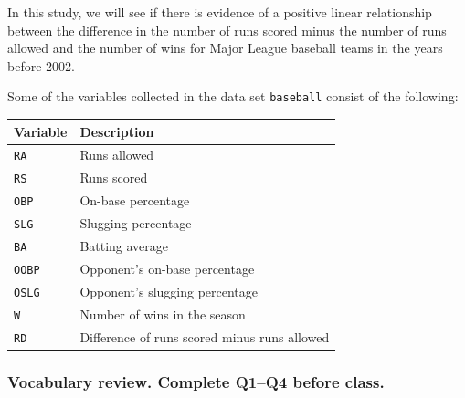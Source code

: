 \documentclass[
]{report}
\newenvironment{Shaded}{\begin{snugshade}}{\end{snugshade}}
\newcommand{\CommentTok}[1]{\textcolor[rgb]{0.56,0.35,0.01}{\textit{#1}}}
\newcommand{\DecValTok}[1]{\textcolor[rgb]{0.00,0.00,0.81}{#1}}
\newcommand{\FunctionTok}[1]{\textcolor[rgb]{0.00,0.00,0.00}{#1}}
\newcommand{\NormalTok}[1]{#1}
\newcommand{\OtherTok}[1]{\textcolor[rgb]{0.56,0.35,0.01}{#1}}
\newcommand{\SpecialCharTok}[1]{\textcolor[rgb]{0.00,0.00,0.00}{#1}}
\newcommand{\StringTok}[1]{\textcolor[rgb]{0.31,0.60,0.02}{#1}}
\begin{document}
In this study, we will see if there is evidence of a positive linear relationship between the difference in the number of runs scored minus the number of runs allowed and the number of wins for Major League baseball teams in the years before 2002.

Some of the variables collected in the data set \texttt{baseball} consist of the following:

\begin{longtable}[]{@{}ll@{}}
\toprule
\textbf{Variable} & \textbf{Description} \\
\midrule
\endhead
\texttt{RA} & Runs allowed \\
\texttt{RS} & Runs scored \\
\texttt{OBP} & On-base percentage \\
\texttt{SLG} & Slugging percentage \\
\texttt{BA} & Batting average \\
\texttt{OOBP} & Opponent's on-base percentage \\
\texttt{OSLG} & Opponent's slugging percentage \\
\texttt{W} & Number of wins in the season \\
\texttt{RD} & Difference of runs scored minus runs allowed \\
\bottomrule
\end{longtable}

\begin{Shaded}
\end{Shaded}

\hypertarget{vocabulary-review.-complete-q1q4-before-class.}{%
\subsubsection*{Vocabulary review. Complete Q1--Q4 before class.}\label{vocabulary-review.-complete-q1q4-before-class.}}
\end{document}

